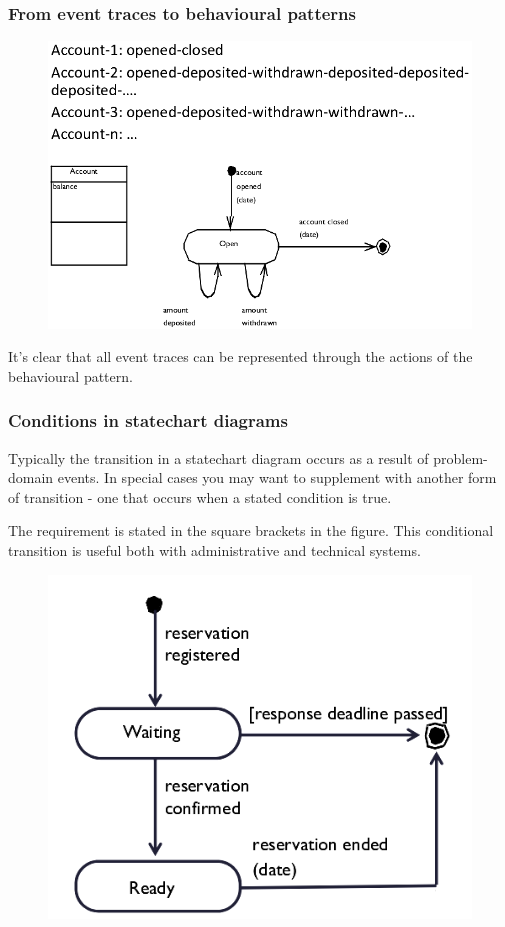 \subsubsection{From event traces to behavioural patterns}
\begin{figure}[H]
    \centering
    \includegraphics[width=.75\textwidth]{figures/eventtracetobehaviouralpattern.png}
\end{figure}

It's clear that all event traces can be represented through the actions of the behavioural pattern. 

\subsubsection{Conditions in statechart diagrams}
Typically the transition in a statechart diagram occurs as a result of problem-domain events. In special cases you may want to supplement with another form of transition - one that occurs when a stated condition is true. 

The requirement is stated in the square brackets in the figure. This conditional transition is useful both with administrative and technical systems.

\begin{figure}[H]
    \centering
    \includegraphics[width=.4\textwidth]{figures/conditionalstatechart.png}
\end{figure}

